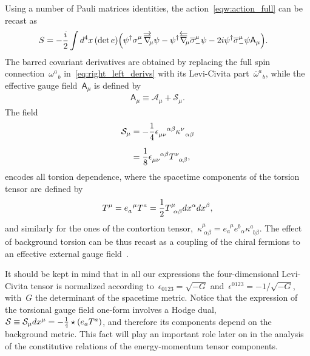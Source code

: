 \documentclass[11pt,a4paper]{article}
\begin{document}
Using a number of Pauli matrices identities,
the action~\eqref{eqw:action_full} can be recast as
\begin{align}
S&=-{i\over 2}\int d^{4}x\,(\det{e})\Big(\psi^{\dagger}\sigma^{\mu}_{-}
\overrightarrow{\overline{\nabla}}_{\!\!\mu}\psi
-\psi^{\dagger}\overleftarrow{\overline{\nabla}}_{\!\!\mu}\overline{\sigma}^{\mu}_{-}\psi
-2i\psi^{\dagger}\overline{\sigma}_{-}^{\mu}\psi\mathsf{A}_{\mu}\Big).
\label{eq:action_effective_axial}
\end{align}
The barred covariant derivatives are obtained by replacing the 
full spin connection~$\omega^{a}_{\,\,\,\,b}$ 
in~\eqref{eq:right_left_derivs} with its Levi-Civita 
part~$\overline{\omega}^{a}_{\,\,\,\,b}$, while
the effective gauge field~$\mathsf{A}_{\mu}$ is
defined by
\begin{align}
\mathsf{A}_{\mu}\equiv\mathcal{A}_{\mu}+\mathcal{S}_{\mu}.
\end{align}
The field 
\begin{align}
\mathcal{S}_{\mu}&=-{1\over 4}\epsilon_{\mu\nu}^{\,\,\,\,\,\,\,\alpha\beta}\kappa^{\nu}_{\,\,\,\,\alpha\beta}
\nonumber \\[0.2cm]
&={1\over 8}\epsilon_{\mu\nu}^{\,\,\,\,\,\,\,\alpha\beta}T^{\nu}_{\,\,\,\,\alpha\beta},
\label{eq:eff_gauge_field}
\end{align}
encodes all torsion dependence,
where the spacetime components of the torsion tensor are defined by
\begin{align}
T^{\mu}=e_{a}^{\,\,\,\,\mu}T^{a}={1\over 2}T^{\mu}_{\,\,\,\alpha\beta}dx^{\alpha}dx^{\beta},
\end{align}
and similarly for the ones of the 
contortion tensor,~$\kappa^{\mu}_{\,\,\alpha\beta}=e_{a}^{\,\,\,\mu}e^{b}_{\,\,\,\alpha}\kappa^{a}_{\,\,\,b\beta}$.
The effect of background torsion can be thus recast as a coupling of the chiral fermions to an effective external 
gauge field~\cite{Hehl:1971qi,Datta:1971id}.

It should be kept in mind that in all our expressions the four-dimensional
Levi-Civita tensor is normalized according to~$\epsilon_{0123}=\sqrt{-G}$ and~$\epsilon^{0123}
=-1/\sqrt{-G}$, with~$G$ the determinant of the spacetime metric. 
Notice that the expression of the torsional gauge field one-form involves a Hodge 
dual,~$\mathcal{S}\equiv \mathcal{S}_{\mu}dx^{\mu}=-{1\over 4}\star(e_{a}T^{a})$, and therefore its components
depend on the background metric. This fact will play an important role later on
in the analysis of the constitutive relations of the energy-momentum tensor components.
\end{document}
